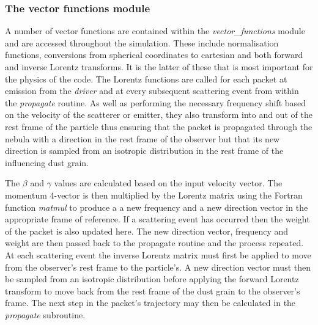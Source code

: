 		\subsubsection{The vector functions module}
		A number of vector functions are contained within the \textit{vector\_functions} module and are accessed throughout the simulation.  These include normalisation functions, conversions from spherical coordinates to cartesian and both forward and inverse Lorentz transforms.  It is the latter of these that is most important for the physics of the code.  The Lorentz functions are called for each packet at emission from the \textit{driver} and at every subsequent scattering event from within the \textit{propagate} routine.  As well as performing the necessary frequency shift based on the velocity of the scatterer or emitter, they also transform into and out of the rest frame of the particle thus ensuring that the packet is propagated through the nebula with a direction in the rest frame of the observer but that its new direction is sampled from an isotropic distribution in the rest frame of the influencing dust grain.  
		
		The $\beta$ and $\gamma$ values are calculated based on the input velocity vector.  The momentum 4-vector is then multiplied by the Lorentz matrix using the Fortran function \textit{matmul} to produce a  a new frequency and a new direction vector in the appropriate frame of reference.  If a scattering event has occurred then the weight of the packet is also updated here.  The new direction vector, frequency and weight are then passed back to the propagate routine and the process repeated.   At each scattering event the inverse Lorentz matrix must first be applied to move from the observer's rest frame to the particle's.  A new direction vector must then be sampled from an isotropic distribution before applying the forward Lorentz transform to move back from the rest frame of the dust grain to the observer's frame.  The next step in the packet's trajectory may then be calculated in the \textit{propagate} subroutine.
		

